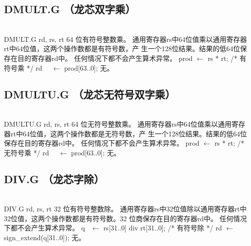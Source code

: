 
\subsection{DMULT.G （龙芯双字乘）}

\begin{instructionblk}
   \\
  \instructionbody
  {DMULT.G rd, rs, rt}
  {64 位有符号整数乘。}
  {通用寄存器rs中64位值乘以通用寄存器rt中64位值，这两个操作数都是有符号数，产
  生一个128位结果。结果的低64位保存在目的寄存器rd中。 \fldnewline
  任何情况下都不会产生算术异常。}
  {prod $\leftarrow$ rs * rt; /* 有符号乘 */ \newline
  rd~~ $\leftarrow$ prod[63..0];}
  {无。}
\end{instructionblk}


\subsection{DMULTU.G （龙芯无符号双字乘）}

\begin{instructionblk}
   \\
  \instructionbody
  {DMULTU.G rd, rs, rt}
  {64 位无符号整数乘。}
  {通用寄存器rs中64位值乘以通用寄存器rt中64位值，这两个操作数都是无符号数，产
  生一个128位结果。结果的低64位保存在目的寄存器rd中。\fldnewline
  任何情况下都不会产生算术异常。}
  {prod $\leftarrow$ rs * rt; /* 无符号乘 */ \newline
  rd~~ $\leftarrow$ prod[63..0];}
  {无。}
\end{instructionblk}

\subsection{DIV.G （龙芯字除）}

\begin{instructionblk}
   \\
  \instructionbody
  {DIV.G rd, rs, rt}
  {32 位有符号整数除。}
  {通用寄存器rs中32位值除以通用寄存器rt中32位值，这两个操作数都是有符号数。32
  位商保存在目的寄存器rd中。 \fldnewline
  任何情况下都不会产生算术异常。}
  {q~ $\leftarrow$ rs[31..0] div rt[31..0]; /* 有符号除 */ \newline
  rd $\leftarrow$ sign\_extend(q[31..0]);}
  {无。}
\end{instructionblk}

